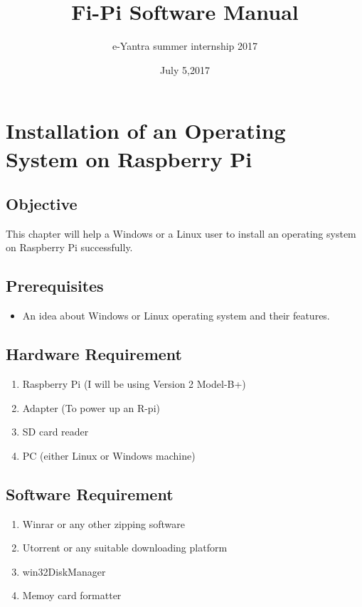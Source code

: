 \documentclass[11pt,a4paper]{report}
\title{Fi-Pi Software Manual }
\author{e-Yantra summer internship 2017}
\date{July 5,2017}
\begin{document}
	\maketitle
	\newpage
	\tableofcontents{}
	\newpage
	
	\chapter{Installation of an Operating System on Raspberry Pi}
	\section{Objective}
	\begin{flushleft}
	 This chapter will help a Windows or a Linux user to install an operating system on Raspberry Pi successfully.
	\end{flushleft}
	\section{Prerequisites}
	\begin{itemize}
		\item An idea about Windows or Linux operating system and their features.
	\end{itemize}
	\section{Hardware Requirement}
	\begin{enumerate}
		\item Raspberry Pi (I will be using Version 2 Model-B+)
		\item Adapter (To power up an R-pi)
		\item SD card reader
		\item PC (either Linux or Windows machine)
	\end{enumerate}
	\section{Software Requirement}
	\begin{enumerate}
		\item Winrar or any other zipping software 
		\item Utorrent or any suitable downloading platform	
		\item win32DiskManager
		\item Memoy card formatter 
	\end{enumerate}
	\newpage
\end{document}
